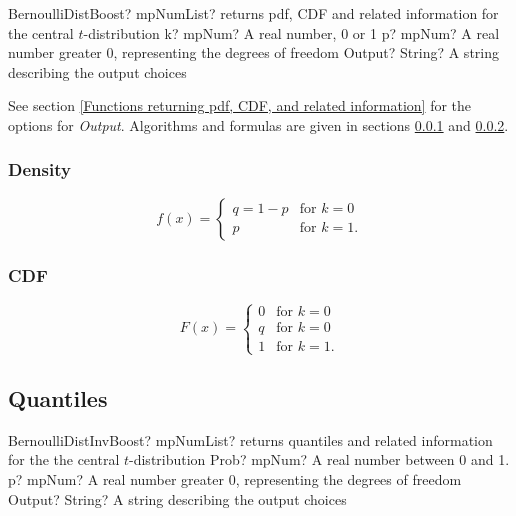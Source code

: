 \begin{mpFunctionsExtract}
	\mpFunctionThree
	{BernoulliDistBoost? mpNumList? returns pdf, CDF and related information for the central $t$-distribution}
	{k? mpNum? A real number, 0 or 1}
	{p? mpNum? A real number greater 0, representing the degrees of freedom}
	{Output? String? A string describing the output choices}
\end{mpFunctionsExtract}


\vspace{0.3cm}
See section \ref{Functions returning pdf, CDF, and related information} for the options for {\itshape\sffamily Output}. Algorithms and formulas are given in sections \ref{BernoulliDistributionDensity} and \ref{BernoulliDistributionCDF}.



\subsubsection{Density}
\label{BernoulliDistributionDensity}


\begin{equation}
	f(x)=\begin{cases}
		q=1-p & \text{for }k=0\\
		p & \text{for }k=1.
	\end{cases}
\end{equation}

\subsubsection{CDF}
\label{BernoulliDistributionCDF}
\begin{equation}
	F(x)=\begin{cases}
		0 & \text{for }k=0\\
		q & \text{for }k=0\\
		1 & \text{for }k=1.
	\end{cases}
\end{equation}




\subsection{Quantiles}

\begin{mpFunctionsExtract}
	\mpFunctionThree
	{BernoulliDistInvBoost? mpNumList? returns quantiles and related information for the the central $t$-distribution}
	{Prob? mpNum? A real number between 0 and 1.}
	{p? mpNum? A real number greater 0, representing the degrees of freedom}
	{Output? String? A string describing the output choices}
\end{mpFunctionsExtract}

